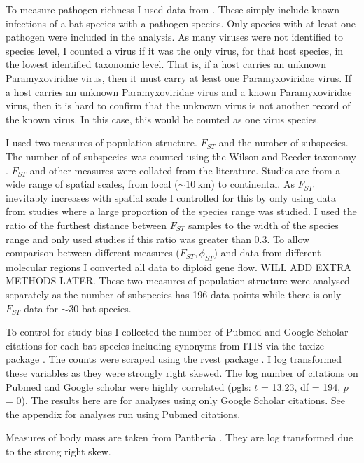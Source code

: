 To measure pathogen richness I used data from \cite{luis2013comparison}. 
These simply include known infections of a bat species with a pathogen species. 
Only species with at least one pathogen were included in the analysis.
As many viruses were not identified to species level, I counted a virus if it was the only virus, for that host species, in the lowest identified taxonomic level.
That is, if a host carries an unknown Paramyxoviridae virus, then it must carry at least one Paramyxoviridae virus.
If a host carries an unknown Paramyxoviridae virus and a known Paramyxoviridae virus, then it is hard to confirm that the unknown virus is not another record of the known virus.
In this case, this would be counted as one virus species.


I used two measures of population structure. 
$F_{ST}$ and the number of subspecies.
The number of of subspecies was counted using the Wilson and Reeder taxonomy \cite{wilson2005mammal}.
$F_{ST}$ and other measures were collated from the literature.
Studies are from a wide range of spatial scales, from local ($\sim\SI{10}{\kilo\metre}$) to continental.
As $F_{ST}$ inevitably increases with spatial scale I controlled for this by only using data from studies where a large proportion of the species range was studied.
I used the ratio of the furthest distance between $F_{ST}$ samples to the width of the species range and only used studies if this ratio was greater than 0.3.
To allow comparison between different measures ($F_{ST}, \phi_{ST}$) and data from different molecular regions I converted all data to diploid gene flow.
WILL ADD EXTRA METHODS LATER.
These two measures of population structure were analysed separately as the number of subspecies has 196 data points while there is only $F_{ST}$ data for $\sim 30$ bat species.

To control for study bias I collected the number of Pubmed and Google Scholar citations for each bat species including synonyms from ITIS \cite{itis} via the taxize package \cite{chamberlain2013taxize}.
The counts were scraped using the rvest package \cite{rvest}.
I log transformed these variables as they were strongly right skewed.
The log number of citations on Pubmed and Google scholar were highly correlated (pgls: $t$ = 13.23, df = 194, $p$ = 0).
The results here are for analyses using only Google Scholar citations.
See the appendix for analyses run using Pubmed citations.

Measures of body mass are taken from Pantheria \cite{jones2009pantheria}.
They are log transformed due to the strong right skew.



